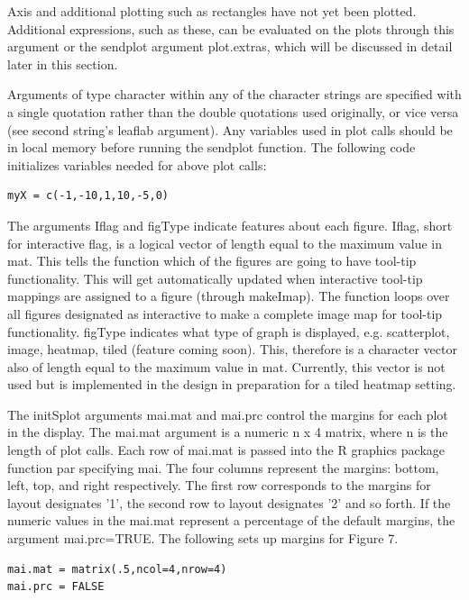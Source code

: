 \documentclass[]{article}
\begin{document}
 Axis and additional plotting such as rectangles have not yet been plotted. Additional expressions, such as these, can be evaluated on the plots through this argument or the sendplot argument plot.extras, which will be discussed in detail later in this section. \newline

\indent Arguments of type character within any of the character strings are specified with a single quotation rather than the double quotations used originally, or vice versa (see second string's leaflab argument). Any variables used in plot calls should be in local memory before running the sendplot function. The following code initializes variables needed for above plot calls:

\begin{verbatim}
myX = c(-1,-10,1,10,-5,0)
\end{verbatim}

\indent The arguments Iflag and figType indicate features about each figure. Iflag, short for interactive flag, is a logical vector of length equal to the maximum value in mat. This tells the function which of the figures are going to have tool-tip functionality. This will get automatically updated when interactive tool-tip mappings are assigned to a figure (through makeImap). The function loops over all figures designated as interactive to make a complete image map for tool-tip functionality. figType indicates what type of graph is displayed, e.g. scatterplot, image, heatmap, tiled (feature coming soon).  This, therefore is a character vector also of length equal to the maximum value in mat. Currently, this vector is not used but is implemented in the design in preparation for a tiled heatmap setting.  \newline


\indent The initSplot arguments mai.mat and mai.prc control the margins for each plot in the display. The mai.mat argument is a numeric n x 4 matrix, where n is the length of plot calls. Each row of mai.mat is passed into the R graphics package function par specifying mai. The four columns represent the margins: bottom, left, top, and right respectively. The first row corresponds to the margins for layout designates '1', the second row to layout designates '2' and so forth. If the numeric values in the mai.mat represent a percentage of the default margins, the argument mai.prc=TRUE. The following sets up margins for Figure 7.


\begin{verbatim}
mai.mat = matrix(.5,ncol=4,nrow=4)
mai.prc = FALSE
\end{verbatim}
\end{document}
